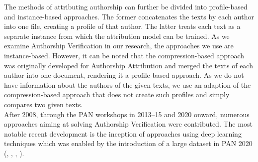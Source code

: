 The methods of attributing authorship can further be divided into profile-based and instance-based approaches.
The former concatenates the texts by each author into one file, creating a profile of that author.
The latter treats each text as a separate instance from which the attribution model can be trained.
As we examine Authorship Verification in our research, the approaches we use are instance-based.
However, it can be noted that the compression-based approach was originally developed for Authorship Attribution and merged the texts of each author into one document, rendering it a profile-based approach.
As we do not have information about the authors of the given texts, we use an adaption of the compression-based approach that does not create such profiles and simply compares two given texts.\\
After 2008, through the PAN workshops in 2013--15 and 2020 onward, numerous approaches aiming at solving Authorship Verification were contributed.
The most notable recent development is the inception of approaches using deep learning techniques which was enabled by the introduction of a large dataset in PAN 2020 (\cite{boenninghoff2020deep}, \cite{weerasinghe2020feature}, \cite{araujo2020siamese}, \cite{ordonez2020will}).\\

